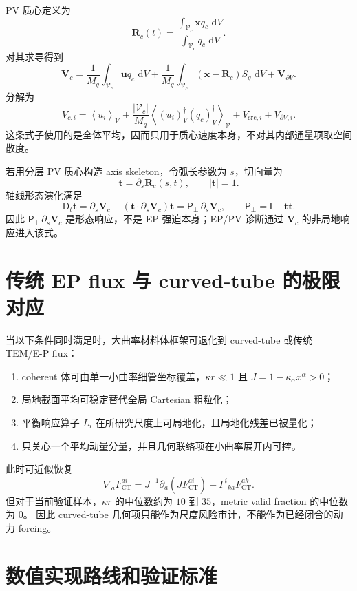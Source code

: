 \documentclass[12pt,a4paper]{ctexart}
\newcommand{\p}{\partial}
\newcommand{\dd}{\,\mathrm d}
\newcommand{\D}{\mathrm D}
\newcommand{\meanV}[1]{\left\langle #1\right\rangle_{\mathcal V}}
\newcommand{\flucV}[1]{\left(#1\right)^{\dagger}_{V}}
\newcommand{\bx}{\boldsymbol x}
\newcommand{\bu}{\boldsymbol u}
\newcommand{\bR}{\boldsymbol R}
\newcommand{\bV}{\boldsymbol V}
\newcommand{\bt}{\boldsymbol t}
\newcommand{\PP}{\boldsymbol{\mathsf P}_{\perp}}
\newcommand{\II}{\boldsymbol{\mathsf I}}
\newcommand{\VV}{\mathcal V_c}
\begin{document}
PV 质心定义为
\[
  \bR_c(t)=
  \frac{\int_{\VV}\bx q_c\,\dd V}{\int_{\VV}q_c\,\dd V}.
\]
对其求导得到
\[
  \bV_c
  =
  \frac{1}{M_q}\int_{\VV}\bu q_c\,\dd V
  +
  \frac{1}{M_q}\int_{\VV}(\bx-\bR_c)S_q\,\dd V
  +
  \bV_{\partial V}.
\]
分解为
\[
  V_{c,i}
  =
  \meanV{u_i}
  +
  \frac{|\VV|}{M_q}\meanV{\flucV{u_i}\flucV{q_c}}
  +
  V_{\mathrm{src},i}
  +
  V_{\partial V,i}.
\]
这条式子使用的是全体平均，因而只用于质心速度本身，不对其内部通量项取空间散度。

若用分层 PV 质心构造 axis skeleton，令弧长参数为 $s$，切向量为
\[
  \bt=\p_s\bR_c(s,t),\qquad |\bt|=1.
\]
轴线形态演化满足
\[
  \D_t\bt
  =
  \p_s\bV_c
  -
  \left(\bt\cdot\p_s\bV_c\right)\bt
  =
  \PP\,\p_s\bV_c,
  \qquad
  \PP=\II-\bt\bt.
\]
因此 $ \PP\,\p_s\bV_c $ 是形态响应，不是 EP 强迫本身；EP/PV 诊断通过 $\bV_c$ 的非局地响应进入该式。

\section{传统 EP flux 与 curved-tube 的极限对应}

当以下条件同时满足时，大曲率材料体框架可退化到 curved-tube 或传统 TEM/E-P flux：
\begin{enumerate}[label=\arabic*.]
  \item coherent 体可由单一小曲率细管坐标覆盖，$\kappa r\ll1$ 且 $J=1-\kappa_\alpha x^\alpha>0$；
  \item 局地截面平均可稳定替代全局 Cartesian 粗粒化；
  \item 平衡响应算子 $L_i$ 在所研究尺度上可局地化，且局地化残差已被量化；
  \item 只关心一个平均动量分量，并且几何联络项在小曲率展开内可控。
\end{enumerate}
此时可近似恢复
\[
  \nabla_aF_{\mathrm{CT}}^{ai}
  =
  J^{-1}\p_a(JF_{\mathrm{CT}}^{ai})
  +
  \Gamma^i{}_{ka}F_{\mathrm{CT}}^{ak}.
\]
但对于当前验证样本，$\kappa r$ 的中位数约为 $10$ 到 $35$，metric valid fraction 的中位数为 $0$。
因此 curved-tube 几何项只能作为尺度风险审计，不能作为已经闭合的动力 forcing。

\section{数值实现路线和验证标准}
\end{document}
